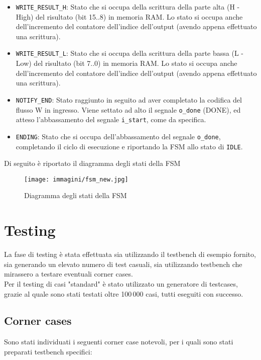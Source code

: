 \documentclass{article}
\begin{document}
\begin{itemize}
    \item \texttt{WRITE\_RESULT\_H}: Stato che si occupa della scrittura della parte alta (H - High) del risultato (bit 15..8) in memoria RAM. Lo stato si occupa anche dell'incremento del contatore dell'indice dell'output (avendo appena effettuato una scrittura).
    \item \texttt{WRITE\_RESULT\_L}: Stato che si occupa della scrittura della parte bassa (L - Low) del risultato (bit 7..0) in memoria RAM. Lo stato si occupa anche dell'incremento del contatore dell'indice dell'output (avendo appena effettuato una scrittura).
    \item \texttt{NOTIFY\_END}: Stato raggiunto in seguito ad aver completato la codifica del flusso W in ingresso. Viene settato ad alto il segnale \texttt{o\_done} (DONE), ed atteso l'abbassamento del segnale \texttt{i\_start}, come da specifica.
    \item \texttt{ENDING}: Stato che si occupa dell'abbassamento del segnale \texttt{o\_done}, completando il ciclo di esecuzione e riportando la FSM allo stato di \texttt{IDLE}.
\end{itemize}

Di seguito è riportato il diagramma degli stati della FSM

\newpage
\begin{figure}[H]
    \centering
    \texttt{[image: immagini/fsm\_new.jpg]}
    \caption{Diagramma degli stati della FSM}
    \label{fig:fsm}
\end{figure}
\newpage


\section{Testing}
La fase di testing è stata effettuata sia utilizzando il testbench di esempio fornito, sia generando un elevato numero di test casuali, sia utilizzando testbench che mirassero a testare eventuali corner cases.\\
Per il testing di casi "standard" è stato utilizzato un generatore di testcases, grazie al quale sono stati testati oltre 100\,000 casi, tutti eseguiti con successo.

\subsection{Corner cases}
Sono stati individuati i seguenti corner case notevoli, per i quali sono stati preparati testbench specifici:
\end{document}
